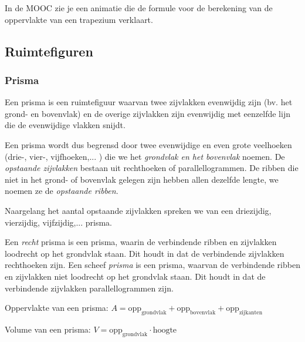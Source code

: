 In de MOOC zie je een animatie die de formule voor de berekening van de oppervlakte van een trapezium verklaart.


\subsection{Ruimtefiguren}

\subsubsection{Prisma}
\begin{definitie}
	Een prisma is een ruimtefiguur waarvan twee zijvlakken evenwijdig zijn (bv. het grond- en bovenvlak) en de overige zijvlakken zijn evenwijdig met eenzelfde lijn die de evenwijdige vlakken snijdt.
\end{definitie} 
Een prisma wordt dus begrensd door twee evenwijdige en even grote veelhoeken (drie-, vier-, vijfhoeken,... ) die we het \emph{grondvlak en het bovenvlak} noemen. De \emph{opstaande zijvlakken} bestaan uit rechthoeken of parallellogrammen. De ribben die niet in het grond- of bovenvlak gelegen zijn hebben allen dezelfde lengte, we noemen ze de \emph{opstaande ribben}.

Naargelang het aantal opstaande zijvlakken spreken we van een driezijdig, vierzijdig, vijfzijdig,... prisma.

Een \emph{recht} prisma is een prisma, waarin de verbindende ribben en zijvlakken loodrecht op het grondvlak staan. Dit houdt in dat de verbindende zijvlakken rechthoeken zijn. Een scheef \emph{prisma} is een prisma, waarvan de verbindende ribben en zijvlakken niet loodrecht op het grondvlak staan. Dit houdt in dat de verbindende zijvlakken parallellogrammen zijn.


		
\begin{ftonthoud}
		Oppervlakte van een prisma: $A=\text{opp}_{\text{grondvlak}}+\text{opp}_{\text{bovenvlak}}+\text{opp}_{\text{zijkanten}}$
		
		Volume van een prisma: $V=\text{opp}_{\text{grondvlak}}\cdot \text{hoogte}$
	
\end{ftonthoud}

